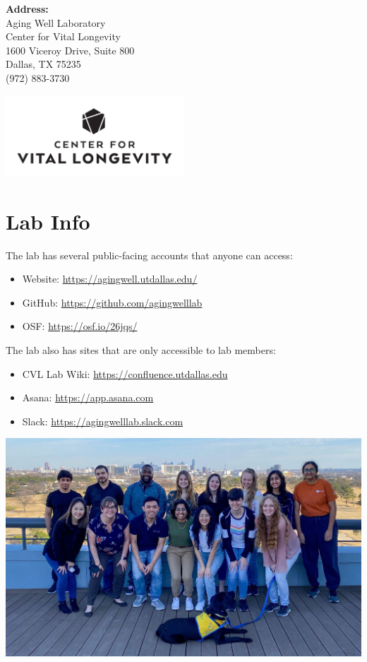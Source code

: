 \documentclass[
]{book}
\providecommand{\tightlist}{%
  \setlength{\itemsep}{0pt}\setlength{\parskip}{0pt}}
\begin{document}
\textbf{Address:}\\
Aging Well Laboratory\\
Center for Vital Longevity\\
1600 Viceroy Drive, Suite 800\\
Dallas, TX 75235\\
(972) 883-3730

\includegraphics[width=0.5\textwidth,height=\textheight]{images/CVL-B-Stacked.png}

\hypertarget{lab-info}{%
\section{Lab Info}\label{lab-info}}

The lab has several public-facing accounts that anyone can access:

\begin{itemize}
\tightlist
\item
  Website: \url{https://agingwell.utdallas.edu/}
\item
  GitHub: \url{https://github.com/agingwelllab}
\item
  OSF: \url{https://osf.io/26jqs/}
\end{itemize}

The lab also has sites that are only accessible to lab members:

\begin{itemize}
\tightlist
\item
  CVL Lab Wiki: \url{https://confluence.utdallas.edu}
\item
  Asana: \url{https://app.asana.com}
\item
  Slack: \url{https://agingwelllab.slack.com}
\end{itemize}

\includegraphics[width=1\textwidth,height=\textheight]{images/Lab_photo_Sp22.jpg}
\end{document}
